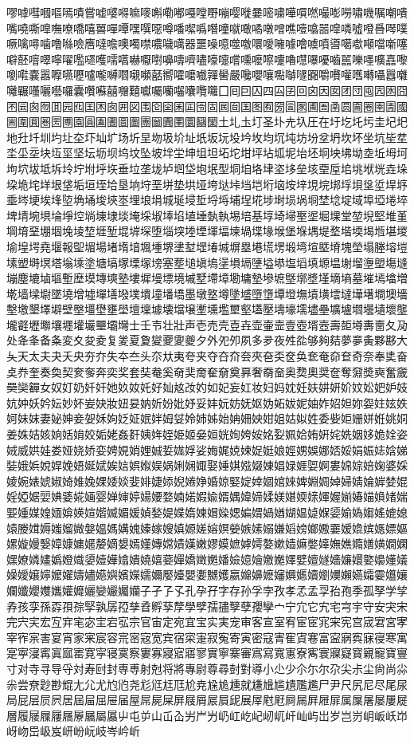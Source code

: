 嘐嘑嘒嘓嘔嘕嘖嘗嘘嘙嘚嘛嘜嘝嘞嘟嘠嘡嘢嘣嘤嘥嘦嘧嘨嘩嘪嘫嘬嘭嘮嘯嘰嘱嘲嘳嘴嘵嘶嘷嘸嘹嘺嘻嘼嘽嘾嘿噀噁噂噃噄噅噆噇噈噉噊噋噌噍噎噏噐噑噒噓噔噕噖噗噘噙噚噛噜噝噞噟噠噡噢噣噤噥噦噧器噩噪噫噬噭噮噯噰噱噲噳噴噵噶噷噸噹噺噻噼噽噾噿嚀嚁嚂嚃嚄嚅嚆嚇嚈嚉嚊嚋嚌嚍嚎嚏嚐嚑嚒嚓嚔嚕嚖嚗嚘嚙嚚嚛嚜嚝嚞嚟嚠嚡嚢嚣嚤嚥嚦嚧嚨嚩嚪嚫嚬嚭嚮嚯嚰嚱嚲嚳嚴嚵嚶嚷嚸嚹嚺嚻嚼嚽嚾嚿囀囁囂囃囄囅囆囇囈囉囊囋囌囍囎囏囐囑囒囓囔囕囖囗囘囙囚四囜囝回囟因囡团団囤囥囦囧囨囩囪囫囬园囮囯困囱囲図围囵囶囷囸囹固囻囼国图囿圀圁圂圃圄圅圆圇圈圉圊國圌圍圎圏圐圑園圓圔圕圖圗團圙圚圛圜圝圞土圠圡圢圣圤圥圦圧在圩圪圫圬圭圮圯地圱圲圳圴圵圶圷圸圹场圻圼圽圾圿址坁坂坃坄坅坆均坈坉坊坋坌坍坎坏坐坑坒坓坔坕坖块坘坙坚坛坜坝坞坟坠坡坢坣坤坥坦坧坨坩坪坫坬坭坮坯坰坱坲坳坴坵坶坷坸坹坺坻坼坽坾坿垀垁垂垃垄垅垆垇垈垉垊型垌垍垎垏垐垑垒垓垔垕垖垗垘垙垚垛垜垝垞垟垠垡垢垣垤垥垦垧垨垩垪垫垬垭垮垯垰垱垲垳垴垵垶垷垸垹垺垻垼垽垾垿埀埁埂埃埄埅埆埇埈埉埊埋埌埍城埏埐埑埒埓埔埕埖埗埘埙埚埛埜埝埞域埠埡埢埣埤埥埦埧埨埩埪埫埬埭埮埯埰埱埲埳埴埵埶執埸培基埻埼埽埾埿堀堁堂堃堄堅堆堇堈堉堊堋堌堍堎堏堐堑堒堓堔堕堖堗堘堙堚堛堜堝堞堟堠堡堢堣堤堥堦堧堨堩堪堫堬堭堮堯堰報堲堳場堵堶堷堸堹堺堻堼堽堾堿塀塁塂塃塄塅塆塇塈塉塊塋塌塍塎塏塐塑塒塓塔塕塖塗塘塙塚塛塜塝塞塟塠塡塢塣塤塥塦塧塨塩塪填塬塭塮塯塰塱塲塳塴塵塶塷塸塹塺塻塼塽塾塿墀墁墂境墄墅墆墇墈墉墊墋墌墍墎墏墐墑墒墓墔墕墖増墘墙墚墛墜墝增墟墠墡墢墣墤墥墦墧墨墩墪墫墬墭墮墯墰墱墲墳墴墵墶墷墸墹墺墻墼墽墾墿壀壁壂壃壄壅壆壇壈壉壊壋壌壍壎壏壐壑壒壓壔壕壖壗壘壙壚壛壜壝壞壟壠壡壢壣壤壥壦壧壨壩壪士壬壭壮壯声壱売壳壴壵壶壷壸壹壺壻壼壽壾壿夀夁夂夃处夅夆备夈変夊夋夌复夎夏夐夑夒夓夔夕外夗夘夙多夛夜夝夞够夠夡夢夣夤夥夦大夨天太夫夬夭央夯夰失夲夳头夵夶夷夸夹夺夻夼夽夾夿奀奁奂奃奄奅奆奇奈奉奊奋奌奍奎奏奐契奒奓奔奕奖套奘奙奚奛奜奝奞奟奠奡奢奣奤奥奦奧奨奩奪奫奬奭奮奯奰奱奲女奴奵奶奷奸她奺奻奼好奾奿妀妁如妃妄妅妆妇妈妉妊妋妌妍妎妏妐妑妒妓妔妕妖妗妘妙妚妛妜妝妞妟妠妡妢妣妤妥妦妧妨妩妪妫妬妭妮妯妰妱妲妳妴妵妶妷妸妹妺妻妼妽妾妿姀姁姂姃姄姅姆姇姈姉姊始姌姍姎姏姐姑姒姓委姕姖姗姘姙姚姛姜姝姞姟姠姡姢姣姤姥姦姧姨姩姪姫姬姭姮姯姰姱姲姳姴姵姶姷姸姹姺姻姼姽姾姿娀威娂娃娄娅娆娇娈娉娊娋娌娍娎娏娐娑娒娓娔娕娖娗娘娙娚娛娜娝娞娟娠娡娢娣娤娥娦娧娨娩娪娫娬娭娮娯娰娱娲娳娴娵娶娷娸娹娺娻娼娽娾娿婀婁婂婃婄婅婆婇婈婉婊婋婌婍婎婏婐婑婒婓婔婕婖婗婘婙婚婛婜婝婞婟婠婡婢婣婤婥婦婧婨婩婪婫婬婭婮婯婰婱婲婳婴婵婶婷婸婹婺婻婼婽婾婿媀媁媂媃媄媅媆媇媈媉媊媋媌媍媎媏媐媑媒媓媔媕媖媗媘媙媚媛媜媝媞媟媠媡媢媣媤媥媦媧媨媩媪媫媬媭媮媯媰媱媲媳媴媵媶媷媸媹媺媻媼媽媾媿嫀嫁嫂嫃嫄嫅嫆嫇嫈嫉嫊嫋嫌嫍嫎嫏嫐嫑嫒嫓嫔嫕嫖嫗嫘嫙嫚嫛嫜嫝嫞嫟嫠嫡嫢嫣嫤嫥嫦嫧嫨嫩嫪嫫嫬嫭嫮嫯嫰嫱嫲嫳嫴嫵嫶嫷嫸嫹嫺嫻嫼嫽嫾嫿嬀嬁嬂嬃嬄嬅嬆嬇嬈嬉嬊嬋嬌嬍嬎嬏嬐嬑嬒嬓嬔嬕嬖嬗嬘嬙嬚嬛嬜嬝嬞嬟嬠嬡嬢嬣嬤嬥嬦嬧嬨嬩嬪嬫嬬嬭嬮嬯嬰嬱嬲嬳嬴嬵嬶嬷嬸嬹嬺嬻嬼嬽嬾嬿孀孁孂孃孄孅孆孇孈孉孊孋孌孍孎孏子孑孒孓孔孕孖字存孙孚孛孜孝孞孟孠孡孢季孤孥学孧孨孩孪孫孬孭孮孯孰孱孲孳孴孵孶孷學孹孺孻孼孽孾孿宀宁宂它宄宅宆宇守安宊宋完宍宎宏宐宑宒宓宔宕宖宗官宙定宛宜宝实実宠审客宣室宥宦宧宨宩宪宫宬宭宮宯宰宱宲害宴宵家宷宸容宺宻宼宽宾宿寀寁寂寃寄寅密寇寈寉寊寋富寍寎寏寐寑寒寓寔寕寖寗寘寙寚寛寜寝寞察寠寡寢寣寤寥實寧寨審寪寫寬寭寮寯寰寱寲寳寴寵寶寷寸对寺寻导寽対寿尀封専尃射尅将將專尉尊尋尌對導小尐少尒尓尔尕尖尗尘尙尚尛尜尝尞尟尠尡尢尣尤尥尦尧尨尩尪尫尬尭尮尯尰就尲尳尴尵尶尷尸尹尺尻尼尽尾尿局屁层屃屄居屆屇屈屉届屋屌屍屎屏屐屑屒屓屔展屖屗屘屙屚屛屜屝属屟屠屡屢屣層履屦屧屨屩屪屫屬屭屮屯屰山屲屳屴屵屶屷屸屹屺屻屼屽屾屿岀岁岂岃岄岅岆岇岈岉岊岋岌岍岎岏岐岑岒岓
